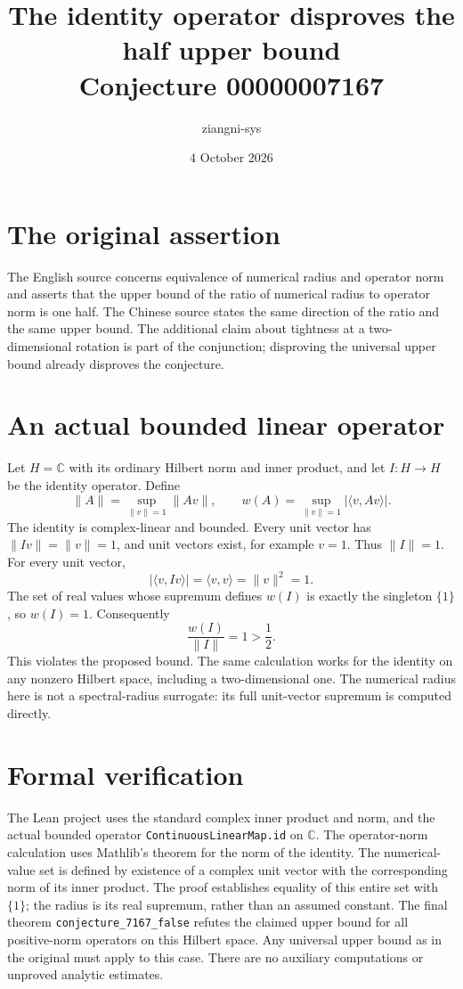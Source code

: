 \documentclass[11pt]{article}
\title{The identity operator disproves the half upper bound\\Conjecture 00000007167}
\author{ziangni-sys}
\date{4 October 2026}
\begin{document}
\maketitle
\section*{The original assertion}
The English source concerns equivalence of numerical radius and operator
norm and asserts that the upper bound of the ratio of numerical radius
to operator norm is one half. The Chinese source states the same direction
of the ratio and the same upper bound.
The additional claim about tightness at a two-dimensional rotation is
part of the conjunction; disproving the universal upper bound already
disproves the conjecture.

\section*{An actual bounded linear operator}
Let $H=\mathbb C$ with its ordinary Hilbert norm and inner product, and
let $I:H\to H$ be the identity operator. Define
\[
\|A\|=\sup_{\|v\|=1}\|Av\|,
\qquad
w(A)=\sup_{\|v\|=1}|\langle v,Av\rangle|.
\]
The identity is complex-linear and bounded. Every unit vector has
$\|Iv\|=\|v\|=1$, and unit vectors exist, for example $v=1$.
Thus $\|I\|=1$.
For every unit vector,
\[
|\langle v,Iv\rangle|=\langle v,v\rangle=\|v\|^2=1.
\]
The set of real values whose supremum defines $w(I)$ is exactly
the singleton $\{1\}$, so $w(I)=1$. Consequently
\[
\frac{w(I)}{\|I\|}=1>\frac12.
\]
This violates the proposed bound. The same calculation works for the
identity on any nonzero Hilbert space, including a two-dimensional one.
The numerical radius here is not a spectral-radius surrogate: its full
unit-vector supremum is computed directly.

\section*{Formal verification}
The Lean project uses the standard complex inner product and norm, and
the actual bounded operator
\texttt{ContinuousLinearMap.id} on $\mathbb C$.
The operator-norm calculation uses Mathlib's theorem for the norm of
the identity.
The numerical-value set is defined by existence of a complex unit vector
with the corresponding norm of its inner product.
The proof establishes equality of this entire set with $\{1\}$;
the radius is its real supremum, rather than an assumed constant.
The final theorem \texttt{conjecture\_7167\_false} refutes the claimed
upper bound for all positive-norm operators on this Hilbert space.
Any universal upper bound as in the original must apply to this case.
There are no auxiliary computations or unproved analytic estimates.
\end{document}
